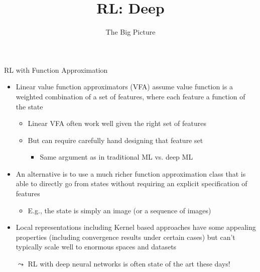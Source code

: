 


\title[Reinforcement Learning: Deep Reinforcement Learning]{RL: Deep}
\subtitle{The Big Picture}




	
	\maketitle

\begin{frame}[c]{RL with Function Approximation}
	
	\begin{itemize}
		\item Linear value function approximators (VFA) assume value function is a weighted combination of a set of features, where each feature a function of the state
		\begin{itemize}
		\item Linear VFA often work well given the \alert{right set of features}
		\item But can require carefully hand designing that feature set
		\begin{itemize}
			\item Same argument as in traditional ML vs. deep ML
		\end{itemize}
		\end{itemize}
		\item An alternative is to use a much richer function approximation class that is able to directly go from states without requiring an explicit specification of features
		\begin{itemize}
			\item E.g., the state is simply an image (or a sequence of images)
		\end{itemize}
		\item Local representations including Kernel based approaches have some	appealing properties (including convergence results under certain	cases) but can’t typically scale well to enormous spaces and datasets
		\item[$\leadsto$] RL with deep neural networks is often state of the art these days!
	\end{itemize}

\end{frame}

